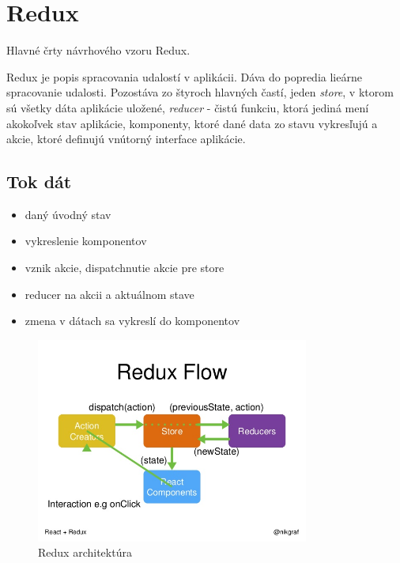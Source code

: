 \section{Redux}
Hlavné črty návrhového vzoru Redux. 

Redux je popis spracovania udalostí v aplikácii. Dáva do popredia lieárne spracovanie udalosti. Pozostáva zo štyroch hlavných častí, jeden \emph{store}, v ktorom sú všetky dáta aplikácie uložené, \emph{reducer} - čistú funkciu, ktorá jediná mení akokoľvek stav aplikácie, komponenty, ktoré dané data zo stavu vykresľujú a akcie, ktoré definujú vnútorný interface aplikácie.

\subsection{Tok dát}
\begin{itemize}
\item daný úvodný stav
\item vykreslenie komponentov
\item vznik akcie, dispatchnutie akcie pre store
\item reducer na akcii a aktuálnom stave
\item zmena v dátach sa vykreslí do komponentov
\end{itemize}


\begin{figure}
  \centering
    \includegraphics[width=0.8\textwidth]{./images/redux.jpg}
  \caption{Redux architektúra}
\end{figure}

